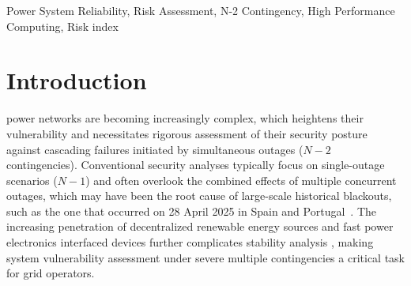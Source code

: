 \documentclass[journal]{IEEEtran}
\begin{document}
\begin{IEEEkeywords}
 Power System Reliability, Risk Assessment,  N-2 Contingency, High Performance Computing, Risk index
\end{IEEEkeywords}


\section{Introduction}

 power networks are becoming increasingly complex, which heightens their vulnerability and necessitates rigorous assessment of their security posture \cite{Breton2025} against cascading failures initiated by simultaneous outages ($N-2$ contingencies). Conventional security analyses typically focus on single-outage scenarios ($N-1$) and often overlook the combined effects of multiple concurrent outages, which may have been the root cause of large-scale historical blackouts, such as the one that occurred on 28 April 2025 in Spain and Portugal~\cite{entsoe_28apr2025}. The increasing penetration of decentralized renewable energy sources and fast power electronics interfaced devices further complicates stability analysis \cite{stability_2023}, making system vulnerability assessment under severe multiple contingencies a critical task for grid operators.
\end{document}
